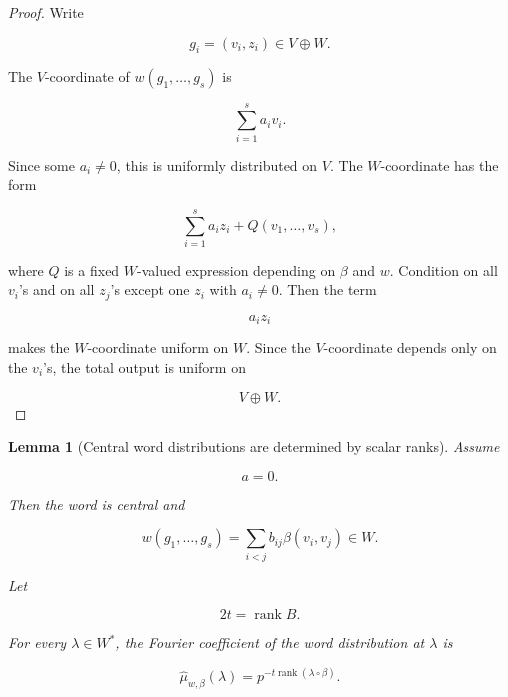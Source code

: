\documentclass[11pt]{article}
\newtheorem{lemma}[theorem]{Lemma}
\begin{document}
\begin{proof}
Write

\[
g_i=(v_i,z_i)\in V\oplus W.
\]

The $V$-coordinate of $w(g_1,\ldots,g_s)$ is

\[
\sum_{i=1}^s a_i v_i.
\]

Since some $a_i\neq0$, this is uniformly distributed on $V$. The $W$-coordinate has the form

\[
\sum_{i=1}^s a_i z_i+Q(v_1,\ldots,v_s),
\]

where $Q$ is a fixed $W$-valued expression depending on $\beta$ and $w$. Condition on all $v_i$'s and on all $z_j$'s except one $z_i$ with $a_i\neq0$. Then the term

\[
a_i z_i
\]

makes the $W$-coordinate uniform on $W$. Since the $V$-coordinate depends only on the $v_i$'s, the total output is uniform on

\[
V\oplus W.
\]

\end{proof}

\begin{lemma}[Central word distributions are determined by scalar ranks]
Assume

\[
a=0.
\]

Then the word is central and

\[
w(g_1,\ldots,g_s)
=\sum_{i<j}b_{ij}\beta(v_i,v_j)
\in W.
\]

Let

\[
2t=\operatorname{rank}B.
\]

For every $\lambda\in W^*$, the Fourier coefficient of the word distribution at $\lambda$ is

\[
\widehat\mu_{w,\beta}(\lambda)
=p^{-t\operatorname{rank}(\lambda\circ\beta)}.
\]

\end{lemma}
\end{document}
